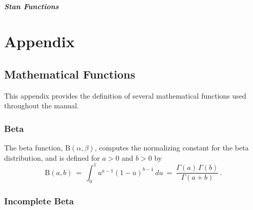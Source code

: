 \begin{description}
{


\subsubsection{Stan Functions}


\begin{description}  \end{description}


\begin{description}  \end{description}


\part{Appendix}


\chapter{Mathematical Functions}\label{math-functions.appendix}


This appendix provides the definition of several mathematical functions used throughout the manual.


\section{Beta}\label{beta-appendix.section}


The beta function, $\text{B}(\alpha,\beta)$, computes the normalizing constant for the beta distribution, and is defined for $a > 0$ and $b > 0$ by \[ \text{B}(a,b) \ = \ \int_0^1 u^{a - 1} (1 - u)^{b - 1} \, du \ = \ \frac{\Gamma(a) \, \Gamma(b)}{\Gamma(a+b)} \, . \] 

\section{Incomplete Beta}\label{inc-beta-appendix.section}


}
\end{description}
